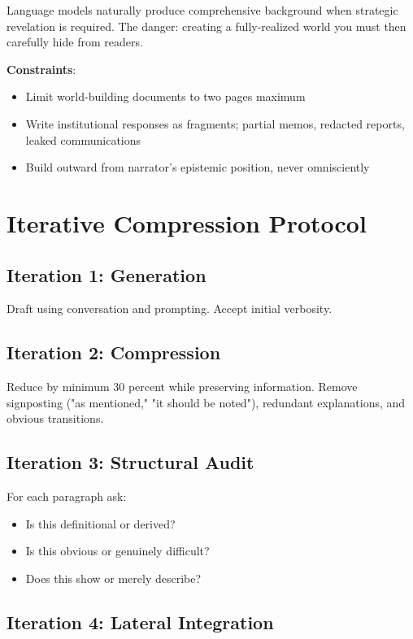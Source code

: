 Language models naturally produce comprehensive background when strategic revelation is required. The danger: creating a fully-realized world you must then carefully hide from readers.

\textbf{Constraints}:

\begin{itemize}
\item Limit world-building documents to two pages maximum
\item Write institutional responses as fragments; partial memos, redacted reports, leaked communications
\item Build outward from narrator's epistemic position, never omnisciently
\end{itemize}

\section*{Iterative Compression Protocol}

\subsection*{Iteration 1: Generation}

Draft using conversation and prompting. Accept initial verbosity.

\subsection*{Iteration 2: Compression}

Reduce by minimum 30 percent while preserving information. Remove signposting ("as mentioned," "it should be noted"), redundant explanations, and obvious transitions.

\subsection*{Iteration 3: Structural Audit}

For each paragraph ask:

\begin{itemize}
\item Is this definitional or derived?
\item Is this obvious or genuinely difficult?
\item Does this show or merely describe?
\end{itemize}

\subsection*{Iteration 4: Lateral Integration}

